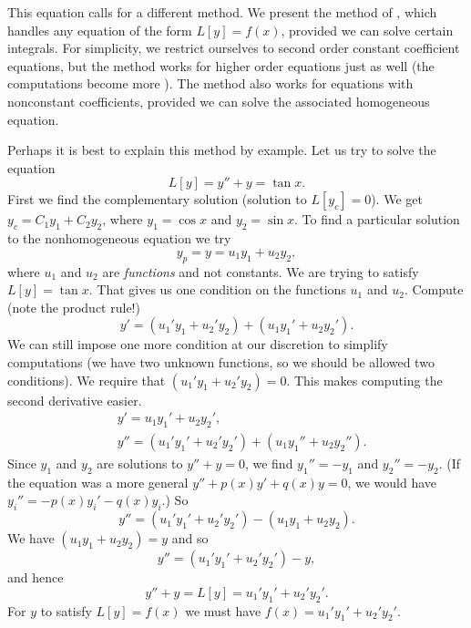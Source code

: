 \documentclass{ximera}
\begin{document}
This equation calls for a different method.  We present the method of \emph{}, which handles any equation of the form $L[y] = f(x)$, provided we can solve certain integrals.  For simplicity, we restrict ourselves to second order constant coefficient equations, but the method works for higher order equations just as well (the computations become more ). %
The method also works for equations with nonconstant coefficients, provided we can solve the associated homogeneous equation.

Perhaps it is best to explain this method by example. Let us try to solve the equation
\begin{equation*}
    L[y] = y''+y = \tan x .
\end{equation*}
First we find the complementary solution (solution to $L[y_c] = 0$). We get $y_c = C_1 y_1 + C_2 y_2$, where $y_1 = \cos x$ and $y_2 = \sin x$. To find a particular solution to the nonhomogeneous equation we try
\begin{equation*}
    y_p = y = u_1 y_1 + u_2 y_2 ,
\end{equation*}
where $u_1$ and $u_2$ are \emph{functions} and not constants. We are trying to satisfy $L[y] = \tan x$.  That gives us one condition on the functions $u_1$ and $u_2$. Compute (note the product rule!)
\begin{equation*}
    y' = (u_1' y_1 + u_2' y_2) + (u_1 y_1' + u_2 y_2').
\end{equation*}
We can still impose one more condition at our discretion to simplify computations (we have two unknown functions, so we should be allowed two conditions).  We require that $(u_1' y_1 + u_2' y_2) = 0$.  This makes computing the second derivative easier.
\begin{align*}
    & y' = u_1 y_1' + u_2 y_2' , \\
    & y'' = (u_1' y_1' + u_2' y_2') + (u_1 y_1'' + u_2 y_2'') .
\end{align*}
Since $y_1$ and $y_2$ are solutions to $y''+y = 0$, we find $y_1'' = - y_1$ and $y_2'' = - y_2$. (If the equation was a more general $y''+p(x)y' +q(x)y = 0$, we would have $y_i'' = -p(x)y_i' -q(x)y_i$.) So 
\begin{equation*}
    y'' = (u_1' y_1' + u_2' y_2') - (u_1 y_1 + u_2 y_2) .
\end{equation*}
We have $(u_1 y_1 + u_2 y_2) = y$ and so
\begin{equation*}
    y'' = (u_1' y_1' + u_2' y_2') - y ,
\end{equation*}
and hence
\begin{equation*}
    y'' + y = L[y] = u_1' y_1' + u_2' y_2' .
\end{equation*}
For $y$ to satisfy $L[y] = f(x)$ we must have $f(x) = u_1' y_1' + u_2' y_2'$.
\end{document}
